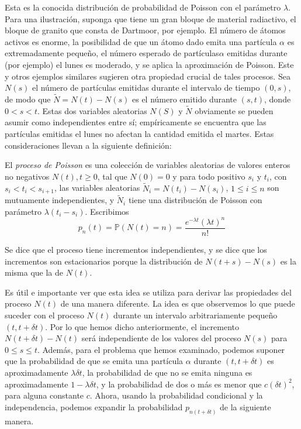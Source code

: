 	Esta es la conocida distribución de probabilidad de Poisson con el parámetro $\lambda$. Para una ilustración, suponga que tiene un gran bloque de material radiactivo, el bloque de granito que consta de Dartmoor, por ejemplo. El número de átomos activos es enorme, la posibilidad de que un átomo dado emita una partícula $\alpha$ es extremadamente pequeño, el número esperado de partículas$\alpha$ emitidas durante (por ejemplo) el lunes es moderado, y se aplica la aproximación de Poisson. Este y otros ejemplos similares sugieren otra propiedad crucial de tales procesos. Sea $N\left(s\right)$ el número de partículas emitidas durante el intervalo de tiempo $\left(0,s\right)$, de modo que $\tilde{N}=N\left(t\right)-N\left(s\right)$ es el número emitido durante $\left(s,t\right)$, donde $0<s<t$. Estas dos variables aleatorias $N\left(S\right)$ y $\tilde{N}$ obviamente se pueden asumir como independientes entre sí; empíricamente se encuentra que las partículas emitidas el lunes no afectan la cantidad emitida el martes. Estas consideraciones llevan a la siguiente definición:
	\begin{definition}
		El \textit{proceso de Poisson} es una colección de variables aleatorias de valores enteros no negativos $N\left(t\right), t\ge0$, tal que $N\left(0\right)=0$ y para todo positivo $s_{i}$ y $t_{i}$, con $s_{i}<t_{i}<s_{i+1}$, las variables aleatorias $\tilde{N}_{i}=N\left(t_{i}\right)-N\left(s_{i}\right)$, $1\le i\le n$ son mutuamente independientes, y $\tilde{N}_{i}$ tiene una distribución de Poisson con parámetro $\lambda\left(t_{i}-s_{i}\right)$. Escribimos
		\begin{equation}\label{eq:2}
		p_{n}\left(t\right)=\mathds{P}\left(N\left(t\right)=n\right)=\frac{e^{-\lambda t}{\left(\lambda t\right)}^{n}}{n!}
		\end{equation}
	\end{definition}
	Se dice que el proceso tiene incrementos independientes, y se dice que los incrementos son estacionarios porque la distribución de $N\left(t+s\right)-N\left(s\right)$ es la misma que la de $N\left(t\right)$.

	Es útil e importante ver que esta idea se utiliza para derivar las propiedades del proceso $N\left(t\right)$ de una manera diferente. La idea es que observemos lo que puede suceder con el proceso $N\left(t\right)$ durante un intervalo arbitrariamente pequeño $\left(t,t+\delta t\right)$. %
	Por lo que hemos dicho anteriormente, el incremento $N\left(t+\delta t\right)-N\left(t\right)$ será independiente de los valores del proceso $N\left(s\right)$ para $0\le s\le t$. Además, para el problema que hemos examinado, podemos suponer que la probabilidad de que se emita una partícula $\alpha$ durante $\left(t,t+\delta t\right)$ es aproximadamente $\lambda\delta t$, la probabilidad de que no se emita ninguna es aproximadamente $1-\lambda\delta t$, y la probabilidad de dos o más es menor que $c{\left(\delta t\right)}^{2}$, para alguna constante $c$. Ahora, usando la probabilidad condicional y la independencia, podemos expandir la probabilidad $p_{n\left(t+\delta t\right)}$ de la siguiente manera.

